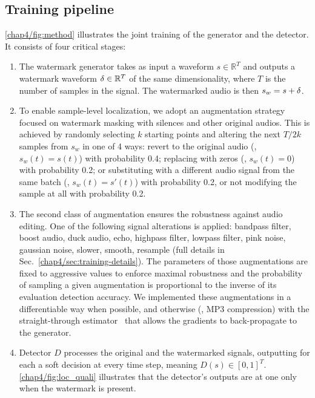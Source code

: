 \subsection{Training pipeline} 
\autoref{chap4/fig:method} illustrates the joint training of the generator and the detector.
It consists of four critical stages:
\begin{enumerate}[label=(\roman*), itemsep=2pt, topsep=2pt, leftmargin=20pt]
    \item The watermark generator takes as input a waveform $s \in \mathbb{R}^T$ and outputs a watermark waveform $\delta \in \mathbb{R}^T$ of the same dimensionality, where $T$ is the number of samples in the  signal. The watermarked audio is then $s_w = s+\delta$.
    \item To enable sample-level localization, we adopt an augmentation strategy focused on watermark masking with silences and other original audios. This is achieved by 
    randomly selecting $k$ starting points and altering the next $T/2k$ samples from $s_w$ in one of 4 ways: revert to the original audio (\ie, $s_w(t)=s(t)$) with probability 0.4; replacing with zeros (\ie, $s_w(t)=0$) with probability 0.2; or substituting with a different audio signal from the same batch (\ie, $s_w(t) = s'(t)$) with probability 0.2, or not modifying the sample at all with probability 0.2.
    \item The second class of augmentation ensures the robustness against audio editing. 
    One of the following signal alterations is applied: 
    bandpass filter, boost audio, duck audio, echo, highpass filter, lowpass filter, pink noise, gaussian noise, slower, smooth, resample (full details in Sec.~\ref{chap4/sec:training-details}). 
    The parameters of those augmentations are fixed to aggressive values to enforce maximal robustness and the
    probability of sampling a given augmentation is proportional to the inverse of its evaluation detection accuracy.
    We implemented these augmentations in a differentiable way when possible, and otherwise (\eg, MP3 compression) with the straight-through estimator~\citep{yin2019understanding} that allows the gradients to back-propagate to the generator.
    \item 
    Detector $D$ processes the original and the watermarked signals, outputting for each a soft decision at every time step, meaning $D(s) \in [0, 1]^T$.
    \autoref{chap4/fig:loc_quali}
    illustrates that the detector's outputs
    are at one only when the watermark is present.
\end{enumerate}









